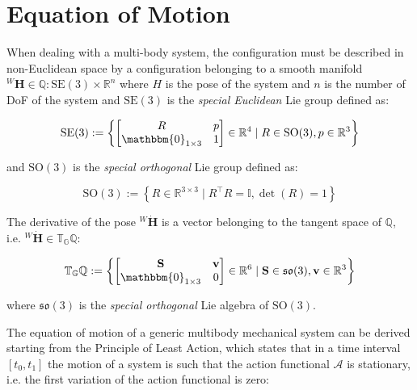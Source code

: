 \section{Equation of Motion}
\label{sec:back_eom}

When dealing with a multi-body system, the configuration must be described in non-Euclidean space by a configuration belonging to a smooth manifold ${}^W\mathbf{H} \in \mathbb{Q}:\mathrm{SE}(3)\times\mathbb{R}^n$ where $H$ is the pose of the system and $n$ is the number of \ac{DoF} of the system and $\mathrm{SE}(3)$ is the \textit{special Euclidean} Lie group defined as:

\begin{equation}
    \mathrm{SE}(3) := \left\{
    \begin{bmatrix}
        R                         & p \\
        \mathbbm{0} _{1 \times 3} & 1
    \end{bmatrix} \in \mathbb{R} ^4 \mid R \in \mathrm{SO}(3), p \in \mathbb{R} ^3
    \right\}
\end{equation}

and $\mathrm{SO}(3)$ is the \textit{special orthogonal} Lie group defined as:

\begin{equation}
    \mathrm{SO}(3) := \left\{
    R \in \mathbb{R} ^{3 \times 3} \mid R ^\top R = \mathbb{I}, \det(R) = 1
    \right\}
\end{equation}

The derivative of the pose ${}^W\dot{\mathbf{H}}$ is a vector belonging to the tangent space of $\mathbb{Q}$, i.e. ${}^W\dot{\mathbf{H}} \in \mathbb{T} _{\mathbb{G}} \mathbb{Q}$:

\begin{equation}
    \mathbb{T} _{\mathbb{G}} \mathbb{Q} := \left\{
    \begin{bmatrix}
        \mathbf{S}                & \mathbf{v} \\
        \mathbbm{0} _{1 \times 3} & 0
    \end{bmatrix} \in \mathbb{R} ^6 \mid \mathbf{S} \in \mathfrak{so}(3), \mathbf{v} \in \mathbb{R} ^3
    \right\}
\end{equation}

where $\mathfrak{so}(3)$ is the \textit{special orthogonal} Lie algebra of $\mathrm{SO}(3)$.

The equation of motion of a generic multibody mechanical system can be derived starting from the Principle of Least Action, which states that in a time interval $[t _0, t _1]$ the motion of a system is such that the action functional $\mathcal{A}$ is stationary, i.e. the first variation of the action functional is zero:

